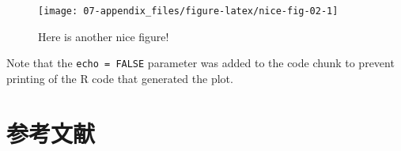 \documentclass[
  lang=cn,
  11pt,
  scheme=chinese,
  chinesefont=nofont,
  citestyle=gb7714-2015,
  bibstyle=gb7714-2015]{elegantbook}
\begin{document}
\begin{figure}

{\centering \texttt{[image: 07-appendix\_files/figure-latex/nice-fig-02-1]} 

}

\caption{Here is another nice figure!}\label{fig:nice-fig-02}
\end{figure}

Note that the \texttt{echo\ =\ FALSE} parameter was added to the code chunk to prevent printing of the R code that generated the plot.

\chapter*{参考文献}\label{References}
\end{document}
